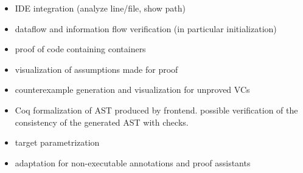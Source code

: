 \documentclass[sttt,draft]{svjour}
\begin{document}
\begin{itemize}
\item IDE integration (analyze line/file, show path)
\item dataflow and information flow verification (in particular initialization)
\item proof of code containing containers
\item visualization of assumptions made for proof
\item counterexample generation and visualization for unproved VCs
\item Coq formalization of AST produced by frontend. possible verification of
  the consistency of the generated AST with checks.
\item target parametrization
\item adaptation for non-executable annotations and proof assistants
\end{itemize}

%


\end{document}
